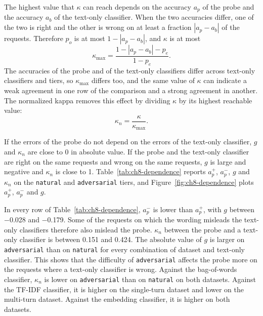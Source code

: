 The highest value that $\kappa$ can reach depends on the accuracy $a_p$ of the probe and the accuracy $a_b$ of the text-only classifier. When the two accuracies differ, one of the two is right and the other is wrong on at least a fraction $|a_p - a_b|$ of the requests. Therefore $p_o$ is at most $1 - |a_p - a_b|$, and $\kappa$ is at most
\[
    \kappa_{\max} = \frac{1 - |a_p - a_b| - p_e}{1 - p_e}.
\]
The accuracies of the probe and of the text-only classifiers differ across text-only classifiers and tiers, so $\kappa_{\max}$ differs too, and the same value of $\kappa$ can indicate a weak agreement in one row of the comparison and a strong agreement in another. The normalized kappa removes this effect by dividing $\kappa$ by its highest reachable value:
\[
    \kappa_n = \frac{\kappa}{\kappa_{\max}}.
\]

If the errors of the probe do not depend on the errors of the text-only classifier, $g$ and $\kappa_n$ are close to 0 in absolute value. If the probe and the text-only classifier are right on the same requests and wrong on the same requests, $g$ is large and negative and $\kappa_n$ is close to 1. Table~\ref{tab:ch8-dependence} reports $a_p^{+}$, $a_p^{-}$, $g$ and $\kappa_n$ on the \texttt{natural} and \texttt{adversarial} tiers, and Figure~\ref{fig:ch8-dependence} plots $a_p^{+}$, $a_p^{-}$ and $g$.

In every row of Table~\ref{tab:ch8-dependence}, $a_p^{-}$ is lower than $a_p^{+}$, with $g$ between $-$0.028 and $-$0.179. Some of the requests on which the wording misleads the text-only classifiers therefore also mislead the probe. $\kappa_n$ between the probe and a text-only classifier is between 0.151 and 0.424. The absolute value of $g$ is larger on \texttt{adversarial} than on \texttt{natural} for every combination of dataset and text-only classifier. This shows that the difficulty of \texttt{adversarial} affects the probe more on the requests where a text-only classifier is wrong. Against the bag-of-words classifier, $\kappa_n$ is lower on \texttt{adversarial} than on \texttt{natural} on both datasets. Against the TF-IDF classifier, it is higher on the single-turn dataset and lower on the multi-turn dataset. Against the embedding classifier, it is higher on both datasets.

